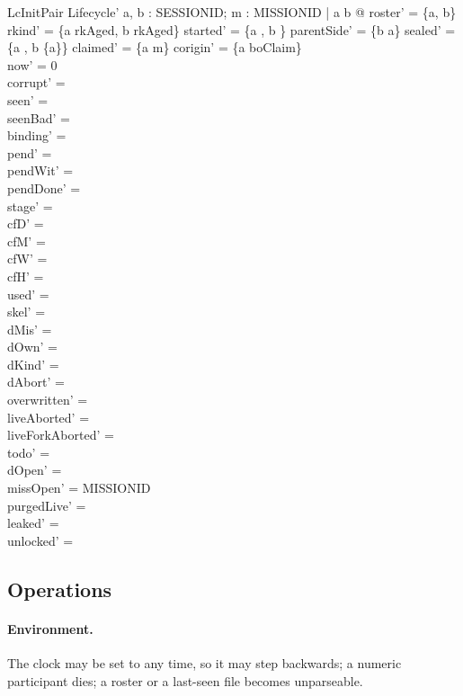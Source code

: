 \documentclass[a4paper,10pt,fleqn]{article}
\begin{document}
\begin{schema}{LcInitPair}
Lifecycle'
\where
\exists a, b : SESSIONID; m : MISSIONID | a \neq b @ roster' = \{a, b\} \land rkind' = \{a \mapsto rkAged, b \mapsto rkAged\} \land started' = \{a , b \} \land parentSide' = \{b \mapsto a\} \land sealed' = \{a \mapsto \emptyset, b \mapsto \{a\}\} \land claimed' = \{a \mapsto m\} \land corigin' = \{a \mapsto boClaim\} \\
now' = 0 \\
corrupt' = \emptyset \\
seen' = \emptyset \\
seenBad' = \emptyset \\
binding' = \emptyset \\
pend' = \emptyset \\
pendWit' = \emptyset \\
pendDone' = \emptyset \\
stage' = \emptyset \\
cfD' = \emptyset \\
cfM' = \emptyset \\
cfW' = \emptyset \\
cfH' = \emptyset \\
used' = \emptyset \\
skel' = \emptyset \\
dMis' = \emptyset \\
dOwn' = \emptyset \\
dKind' = \emptyset \\
dAbort' = \emptyset \\
overwritten' = \emptyset \\
liveAborted' = \emptyset \\
liveForkAborted' = \emptyset \\
todo' = \emptyset \\
dOpen' = \emptyset \\
missOpen' = MISSIONID \\
purgedLive' = \emptyset \\
leaked' = \emptyset \\
unlocked' = \emptyset
\end{schema}



\subsection{Operations}
\label{sec:lc-ops}

\paragraph{Environment.} The clock may be set to any time, so it may step
backwards; a numeric participant dies; a roster or a last-seen file
becomes unparseable.
\end{document}
